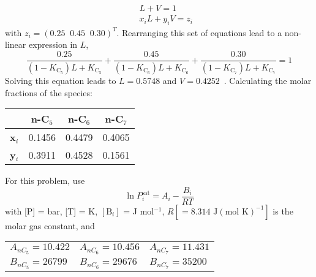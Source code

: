 \documentclass[calculator,steamtables,allquestions,datasheet,resit,solution]{exam_newMarcus2}
\newcommand{\frc}{\displaystyle\frac}
\begin{document}
\begin{question}
\begin{enumerate}[(a)]
{\begin{eqnarray}
&& L + V = 1 \nonumber \\
&& x_{i}L + y_{i}V = z_{i} \nonumber 
\end{eqnarray}
with $z_{i}=\left(0.25\;\;0.45\;\;0.30\right)^{T}$. Rearranging this set of equations lead to a non-linear expression in $L$,~
\begin{displaymath}
\frc{0.25}{\left(1-K_{\text{C}_{5}}\right)L+K_{\text{C}_{5}}} + \frc{0.45}{\left(1-K_{\text{C}_{6}}\right)L+K_{\text{C}_{6}}} +  \frc{0.30}{\left(1-K_{\text{C}_{7}}\right)L+K_{\text{C}_{7}}} = 1 
\end{displaymath}
Solving this equation leads to $L=0.5748$ and $V=0.4252$~. Calculating the molar fractions of the species:~
\begin{center}
\begin{tabular}{c c c c}
\hline
                 & {\bf n-C$_{5}$} &  {\bf n-C$_{6}$} &  {\bf n-C$_{7}$} \\
\hline
  {\bf x$_{i}$}   & 0.1456         &  0.4479         & 0.4065    \\
  {\bf y$_{i}$}   &  0.3911        &  0.4528         & 0.1561    \\
\hline
\end{tabular} 
\end{center}}

%
\end{enumerate}

For this problem, use 
\begin{displaymath}
   \ln P_{i}^{\text{sat}} = A_{i} - \frc{B_{i}}{RT}
\end{displaymath} 
with [P] = bar, [T] = K, $\left[\text{B}_{i}\right]$ = J mol$^{-1}$, $R\left[=\text{8.314 J}\left(\text{mol K}\right)^{-1}\right]$ is the molar gas constant, and
    \begin{center}
       \begin{tabular}{l l l} 
          $A_{nC_{5}}=10.422$ & $A_{nC_{6}}=10.456$ & $A_{nC_{7}}=11.431$ \\
          $B_{nC_{5}}=26799$  & $B_{nC_{6}}=29676$  & $B_{nC_{7}}=35200$  
       \end{tabular}
    \end{center}
%
\end{question}

\clearpage
\end{document}

